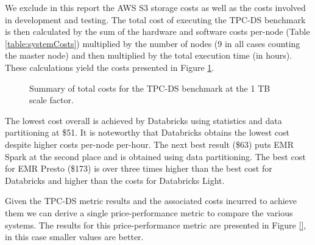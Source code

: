 We exclude in this report the AWS S3 storage costs as well as the costs involved in development and testing. The total cost of executing the TPC-DS benchmark is then calculated by the sum of the hardware and software costs per-node (Table \ref{table:systemCosts}) multiplied by the number of nodes (9 in all cases counting the master node) and then multiplied by the total execution time (in hours). These calculations yield the costs presented in Figure \ref{fig:totalCostsSummary}.

\begin{figure}
   \begin{center}
   \end{center}
   \caption{Summary of total costs for the TPC-DS benchmark at the 1 TB scale factor.}
   \label{fig:totalCostsSummary}
\end{figure}

The lowest cost overall is achieved by Databricks using statistics and data partitioning at \$51. It is noteworthy that Databricks obtains the lowest cost despite higher costs per-node per-hour. The next best result (\$63) puts EMR Spark at the second place and is obtained using data partitioning. The best cost for EMR Presto (\$173) is over three times higher than the best cost for Databricks and higher than the costs for Databricks Light.

Given the TPC-DS metric results and the associated costs incurred to achieve them we can derive a single price-performance metric to compare the various systems. The results for this price-performance metric are presented in Figure \ref{}, in this case smaller values are better.










